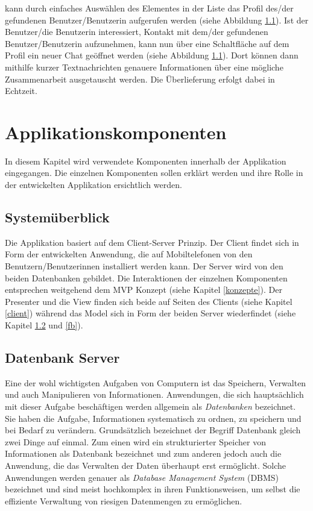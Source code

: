 \documentclass[a4paper,11pt]{report}
\begin{document}
kann durch einfaches Auswählen des Elementes in der Liste das Profil des/der gefundenen Benutzer/Benutzerin aufgerufen werden (siehe Abbildung \ref{}). Ist der Benutzer/die Benutzerin interessiert, Kontakt mit dem/der gefundenen Benutzer/Benutzerin aufzunehmen, kann nun über eine Schaltfläche auf dem Profil ein neuer Chat geöffnet werden (siehe Abbildung \ref{}). Dort können dann mithilfe kurzer Textnachrichten genauere Informationen über eine mögliche Zusammenarbeit ausgetauscht werden. Die Überlieferung erfolgt dabei in Echtzeit.
	
	\chapter{Applikationskomponenten}
	In diesem Kapitel wird verwendete Komponenten innerhalb der Applikation eingegangen. Die einzelnen Komponenten sollen erklärt werden und ihre Rolle in der entwickelten Applikation ersichtlich werden.
		\section{Systemüberblick}
		Die Applikation basiert auf dem Client-Server Prinzip. Der Client findet sich in Form der entwickelten Anwendung, die auf Mobiltelefonen von den Benutzern/Benutzerinnen installiert werden kann. Der Server wird von den beiden Datenbanken gebildet. Die Interaktionen der einzelnen Komponenten entsprechen weitgehend dem MVP Konzept (siehe Kapitel \ref{konzepte}). Der Presenter und die View finden sich beide auf Seiten des Clients (siehe Kapitel \ref{client}) während das Model sich in Form der beiden Server wiederfindet (siehe Kapitel \ref{server} und \ref{fb}).
		
			\section{Datenbank Server} \label{server}
			Eine der wohl wichtigsten Aufgaben von Computern ist das Speichern, Verwalten und auch Manipulieren von Informationen. Anwendungen, die sich hauptsächlich mit dieser Aufgabe beschäftigen werden allgemein als \emph{Datenbanken} bezeichnet. Sie haben die Aufgabe, Informationen systematisch zu ordnen, zu speichern und bei Bedarf zu verändern. Grundsätzlich bezeichnet der Begriff Datenbank gleich zwei Dinge auf einmal. Zum einen wird ein strukturierter Speicher von Informationen als Datenbank bezeichnet und zum anderen jedoch auch die Anwendung, die das Verwalten der Daten überhaupt erst ermöglicht. Solche Anwendungen werden genauer als \emph{Database Management System} (DBMS) bezeichnet und sind meist hochkomplex in ihren Funktionsweisen, um selbst die effiziente Verwaltung von riesigen Datenmengen zu ermöglichen. \cite{IT-Handbuch}
			
\end{document}
